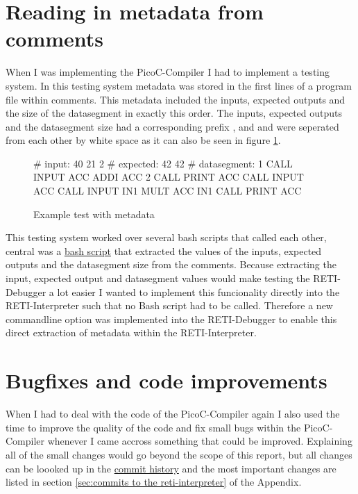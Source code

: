\documentclass{report}
\begin{document}
\section{Reading in metadata from comments}
\label{sec:reading in metadata from comments}

When I was implementing the PicoC-Compiler I had to implement a testing system. In this testing system metadata was stored in the first lines of a program file within comments. This metadata included the inputs, expected outputs and the size of the datasegment in exactly this order. The inputs, expected outputs and the datasegment size had a corresponding prefix ,  and  and were seperated from each other by white space as it can also be seen in figure \ref{code:example_test}.

\begin{figure}[H]
	\centering
	\begin{dfile}[minted language=bash,minted options={fontsize=\small,autogobble}]
		# input: 40 21 2
		# expected: 42 42
		# datasegment: 1
		CALL INPUT ACC
		ADDI ACC 2
		CALL PRINT ACC
		CALL INPUT ACC
		CALL INPUT IN1
		MULT ACC IN1
		CALL PRINT ACC
	\end{dfile}
	\caption{Example test with metadata}
	\label{code:example_test}
\end{figure}

This testing system worked over several bash scripts that called each other, central was a \href{https://github.com/matthejue/PicoC-Compiler/blob/missing_semester_project/extract_input_and_expected.sh}{bash script} that extracted the values of the inputs, expected outputs and the datasegment size from the comments. Because extracting the input, expected output and datasegment values would make testing the RETI-Debugger a lot easier I wanted to implement this funcionality directly into the RETI-Interpreter such that no Bash script had to be called. Therefore a new commandline option  was implemented into the RETI-Debugger to enable this direct extraction of metadata within the RETI-Interpreter.

\section{Bugfixes and code improvements}
\label{sec:bugfixes and code improvements}

When I had to deal with the code of the PicoC-Compiler again I also used the time to improve the quality of the code and fix small bugs within the PicoC-Compiler whenever I came accross something that could be improved. Explaining all of the small changes would go beyond the scope of this report, but all changes can be loooked up in the \href{https://github.com/matthejue/PicoC-Compiler/commits/missing_semester_project}{commit history} and the most important changes are listed in section \ref{sec:commits to the reti-interpreter} of the Appendix.
\end{document}
